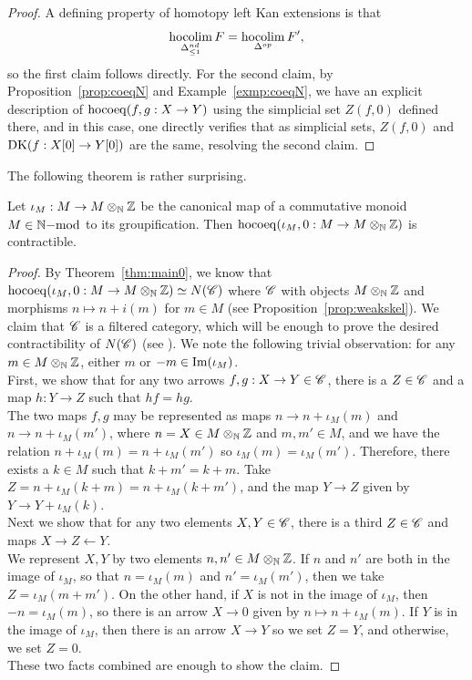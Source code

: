\begin{proof}
A defining property of homotopy left Kan extensions is that 
\[\operatorname*{hocolim}_{\Delta^{nd}_{\le 1}} F = \operatorname*{hocolim}_{\Delta^{op}} F',\]
so the first claim follows directly. For the second claim, by Proposition~\ref{prop:coeqN} and Example~\ref{exmp:coeqN}, 
we have an explicit description of $\operatorname{hocoeq}(f,g: X \rightarrow Y)$ using the simplicial set $Z(f,0)$ defined there, and in this case, 
one directly verifies that as simplicial sets, $Z(f,0)$ and $\operatorname{DK}(f: X[0]\rightarrow Y[0])$ are the same, resolving the second claim.
\end{proof}
The following theorem is rather surprising.
\begin{theorem}\label{thm:contractab}
Let $\iota_M: M \rightarrow M \otimes_{\mathbb{N}} \mathbb{Z}$ be the canonical map of a commutative monoid $M \in {\mathbb{N}}\mathrm{-mod}$ 
to its groupification. Then $\operatorname{hocoeq}(\iota_M,0: M \rightarrow M \otimes_{\mathbb{N}} \mathbb{Z})$ is contractible.
\end{theorem}
\begin{proof}
By Theorem~\ref{thm:main0}, we know that $\operatorname{hocoeq}(\iota_M,0: M \rightarrow M \otimes_{\mathbb{N}} \mathbb{Z}) \simeq N(\mathscr{C})$ 
where $\mathscr{C}$ with objects $M \otimes_{\mathbb{N}} \mathbb{Z}$ and morphisms $n \mapsto n + i(m)$ for $m \in M$ (see Proposition~\ref{prop:weakskel}). 
We claim that $\mathscr{C}$ is a filtered category,
which will be enough to prove the desired contractibility of $N(\mathscr{C})$ (see \cite[Proposition 5.3.1.18]{htt}). We note the following trivial observation: 
for any $m \in M \otimes_{\mathbb{N}} \mathbb{Z}$, either $m$ or $-m \in \operatorname{Im}(\iota_M)$.\\
\indent First, we show that for any two arrows $f,g: X \rightarrow Y \in \mathscr{C}$, there is a $Z \in \mathscr{C}$ and a map $h:Y \to Z$ such that $hf=hg$.\\
\indent The two maps $f,g$ may be represented as maps $n \to n + \iota_M(m)$ and $n \to n+\iota_M(m')$, 
where $n=X \in M \otimes_{\mathbb{N}} \mathbb{Z}$ and $m,m' \in M$, 
and we have the relation $n+\iota_M(m) = n + \iota_M(m')$ so $ \iota_M(m)  = \iota_M(m')$. Therefore, there exists a $k \in M$ 
such that $k + m' = k+m$. 
Take $Z = n + \iota_M(k + m) = n+\iota_M(k + m')$, and the map $Y \to Z$ given by $Y \to Y + \iota_M(k)$.\\
\indent Next we show that for any two elements $X, Y \in \mathscr{C}$, there is a third $Z \in \mathscr{C}$ and maps $X \to Z \leftarrow Y$.\\
\indent We represent $X, Y$ by two elements $n, n' \in M \otimes_{\mathbb{N}} \mathbb{Z}$. 
If $n$ and $n'$ are both in the image of $\iota_M$, so that $n = \iota_M(m)$ and $n' = \iota_M(m')$, 
then we take $Z = \iota_M(m + m')$. On the other hand, if $X$ is not in the image of $\iota_M$, then $-n=\iota_M(m)$, 
so there is an arrow $X \to 0$ given by $n \mapsto n + \iota_M(m)$. If $Y$ is in the image of $\iota_M$, then there is an arrow $X \to Y$ so we set $Z=Y$,
and otherwise, we set $Z=0$.\\
\indent These two facts combined are enough to show the claim.
\end{proof}
